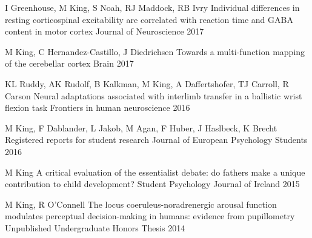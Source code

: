 \begin{cventries}
  \cventry
    {I Greenhouse, M King, S Noah, RJ Maddock, RB Ivry} %
    {Individual differences in resting corticospinal excitability are correlated with reaction time and GABA content in motor cortex} %
    {Journal of Neuroscience} %
    {2017} %
    {}
    
  \cventry
    {M King, C Hernandez-Castillo, J Diedrichsen} %
    {Towards a multi-function mapping of the cerebellar cortex} %
    {Brain} %
    {2017} %
    {}
    
  \cventry
    {KL Ruddy, AK Rudolf, B Kalkman, M King, A Daffertshofer, TJ Carroll, R Carson} %
    {Neural adaptations associated with interlimb transfer in a ballistic wrist flexion task} %
    {Frontiers in human neuroscience} %
    {2016} %
    {}
    
  \cventry
    {M King, F Dablander, L Jakob, M Agan, F Huber, J Haslbeck, K Brecht} %
    {Registered reports for student research} %
    {Journal of European Psychology Students} %
    {2016} %
    {}
    
  \cventry
    {M King} %
    {A critical evaluation of the essentialist debate: do fathers make a unique contribution to child development?} %
    {Student Psychology Journal of Ireland} %
    {2015} %
    {}
    
  \cventry
    {M King, R O'Connell} %
    {The locus coeruleus-noradrenergic arousal function modulates perceptual decision-making in humans: evidence from pupillometry} %
    {Unpublished Undergraduate Honors Thesis} %
    {2014} %
    {}

\end{cventries}
